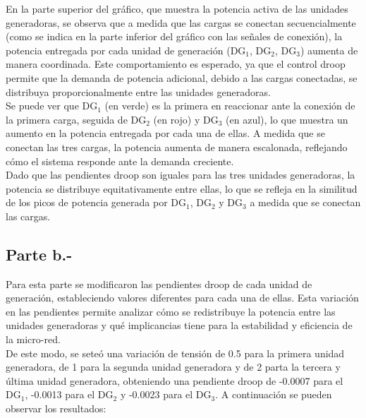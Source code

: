 En la parte superior del gráfico, que muestra la potencia activa de las unidades generadoras, se observa que a medida que las cargas se conectan secuencialmente (como se indica en la parte inferior del gráfico con las señales de conexión), la potencia entregada por cada unidad de generación (DG$_1$, DG$_2$, DG$_3$) aumenta de manera coordinada. Este comportamiento es esperado, ya que el control droop permite que la demanda de potencia adicional, debido a las cargas conectadas, se distribuya proporcionalmente entre las unidades generadoras.\\

Se puede ver que DG$_1$ (en verde) es la primera en reaccionar ante la conexión de la primera carga, seguida de DG$_2$ (en rojo) y DG$_3$ (en azul), lo que muestra un aumento en la potencia entregada por cada una de ellas. A medida que se conectan las tres cargas, la potencia aumenta de manera escalonada, reflejando cómo el sistema responde ante la demanda creciente.\\

Dado que las pendientes droop son iguales para las tres unidades generadoras, la potencia se distribuye equitativamente entre ellas, lo que se refleja en la similitud de los picos de potencia generada por DG$_1$, DG$_2$ y DG$_3$ a medida que se conectan las cargas.

\subsection{Parte b.-}

Para esta parte se modificaron las pendientes droop de cada unidad de generación, estableciendo valores diferentes para cada una de ellas. Esta variación en las pendientes permite analizar cómo se redistribuye la potencia entre las unidades generadoras y qué implicancias tiene para la estabilidad y eficiencia de la micro-red.\\

De este modo, se seteó una variación de tensión de 0.5 para la primera unidad generadora, de 1 para la segunda unidad generadora y de 2 parta la tercera y última unidad generadora, obteniendo una pendiente droop de -0.0007 para el DG$_1$, -0.0013 para el DG$_2$ y -0.0023 para el DG$_3$. A continuación se pueden observar los resultados:

